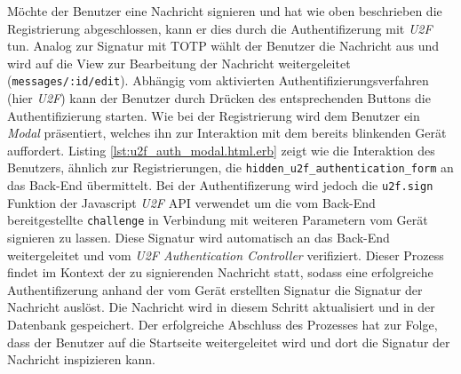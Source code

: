 \documentclass[11pt,a4paper,ngerman]{scrreprt}
\begin{document}
Möchte der Benutzer eine Nachricht signieren und hat wie oben beschrieben die Registrierung abgeschlossen, kann er dies durch die Authentifizerung mit \textit{U2F} tun. Analog zur Signatur mit TOTP wählt der Benutzer die Nachricht aus und wird auf die View zur Bearbeitung der Nachricht weitergeleitet (\texttt{messages/:id/edit}). Abhängig vom aktivierten Authentifizierungsverfahren (hier \textit{U2F}) kann der Benutzer durch Drücken des entsprechenden Buttons die Authentifizierung starten. Wie bei der Registrierung wird dem Benutzer ein \textit{Modal} präsentiert, welches ihn zur Interaktion mit dem bereits blinkenden Gerät auffordert. Listing \ref{lst:u2f_auth_modal.html.erb} zeigt wie die Interaktion des Benutzers, ähnlich zur Registrierungen, die \texttt{hidden\_u2f\_authentication\_form} an das Back-End übermittelt. Bei der Authentifizerung wird jedoch die \texttt{u2f.sign} Funktion der Javascript \textit{U2F} API verwendet um die vom Back-End bereitgestellte \texttt{challenge} in Verbindung mit weiteren Parametern vom Gerät signieren zu lassen. Diese Signatur wird automatisch an das Back-End weitergeleitet und vom \textit{U2F Authentication Controller} verifiziert. Dieser Prozess findet im Kontext der zu signierenden Nachricht statt, sodass eine erfolgreiche Authentifizerung anhand der vom Gerät erstellten Signatur die Signatur der Nachricht auslöst. Die Nachricht wird in diesem Schritt aktualisiert und in der Datenbank gespeichert. Der erfolgreiche Abschluss des Prozesses hat zur Folge, dass der Benutzer auf die Startseite weitergeleitet wird und dort die Signatur der Nachricht inspizieren kann.
\end{document}
